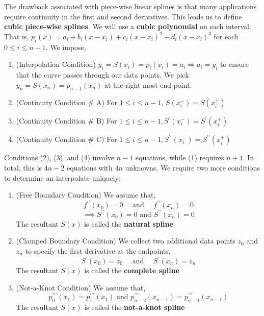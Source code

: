 \noindent The drawback associated with piece-wise linear splines is that many applications require continuity in the first and second derivatives. This leads us to define \textbf{cubic piece-wise splines}. We will use a \textbf{cubic polynomial} on each interval. That is, $p_i(x)=a_i+b_i\left(x-x_i\right)+c_i\left(x-x_i\right)^2+d_i\left(x-x_i\right)^3$ for each $0 \leq i \leq n -1$. We impose,
\begin{enumerate}
    \item (Interpolation Condition) $y_i=S\left(x_i\right)=p_i\left(x_i\right)=a_i \Rightarrow a_i=y_i$ to ensure that the curve passes through our data points. We pick $y_n=S\left(x_n\right)=p_{n-1}\left(x_n\right)$ at the right-most end-point.
    \item (Continuity Condition \# A) For $1 \leq i \leq n-1$, $S\left(x_i^{-}\right)=S\left(x_i^{+}\right)$
    \item (Continuity Condition \# B) For $1 \leq i \leq n-1, S^{\prime}\left(x_i^{-}\right)=S^{\prime}\left(x_i^{+}\right)$
    \item (Continuity Condition \# C) For $1 \leq i \leq n-1, S^{\prime \prime}\left(x_i^{-}\right)=S^{\prime \prime}\left(x_i^{+}\right)$
\end{enumerate}
Conditions (2), (3), and (4) involve $n - 1$ equations, while (1) requires $n + 1$. In total, this is $4n-2$ equations with $4n$ unknowns. We require two more conditions to determine an interpolate uniquely:
\begin{enumerate}
    \item (Free Boundary Condition) We assume that,
    \[f^{\prime \prime}\left(x_0\right)=0 \quad \text{ and } \quad f^{\prime \prime}\left(x_n\right)=0\]
    \[\implies S^{\prime \prime}\left(x_0\right)=0 \text { and } S^{\prime \prime}\left(x_n\right)=0\]
    The resultant $S(x)$ is called the \textbf{natural spline}
    \item (Clamped Boundary Condition) We collect two additional data points $z_0$ and $z_n$ to specify the first derivative at the endpoints,
    \[S^{\prime}\left(x_0\right)=z_0 \quad \text { and } \quad  S^{\prime}\left(x_n\right)=z_n\]
    The resultant $S(x)$ is called the \textbf{complete spline}
    \item (Not-a-Knot Condition) We assume that,
    \[p_0^{\prime \prime \prime}\left(x_1\right)=p_1^{\prime \prime \prime}\left(x_1\right) \text { and } p_{n-2}^{\prime \prime \prime}\left(x_{n-1}\right)=p_{n-1}^{\prime \prime \prime}\left(x_{n-1}\right)\]
    The resultant $S(x)$ is called the \textbf{not-a-knot spline}
\end{enumerate}


